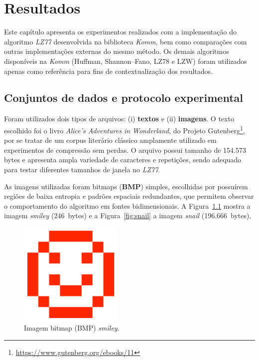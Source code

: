 \chapter{Resultados}\label{cap:Resultados}

Este capítulo apresenta os experimentos realizados com a implementação do algoritmo \textit{LZ77} desenvolvida na biblioteca \textit{Komm}, bem como comparações com outras implementações externas do mesmo método.  
Os demais algoritmos disponíveis na \textit{Komm} (Huffman, Shannon--Fano, LZ78 e LZW) foram utilizados apenas como referência para fins de contextualização dos resultados.

\section{Conjuntos de dados e protocolo experimental}

Foram utilizados dois tipos de arquivos: (i) \textbf{textos} e (ii) \textbf{imagens}.  
O texto escolhido foi o livro \textit{Alice’s Adventures in Wonderland}, do Projeto Gutenberg\footnote{\url{https://www.gutenberg.org/ebooks/11}}, por se tratar de um corpus literário clássico amplamente utilizado em experimentos de compressão sem perdas.  
O arquivo possui tamanho de 154.573 bytes e apresenta ampla variedade de caracteres e repetições, sendo adequado para testar diferentes tamanhos de janela no \textit{LZ77}.  

As imagens utilizadas foram bitmaps (\textbf{BMP}) simples, escolhidas por possuírem regiões de baixa entropia e padrões espaciais redundantes, que permitem observar o comportamento do algoritmo em fontes bidimensionais.  
A Figura~\ref{fig:smiley} mostra a imagem \textit{smiley} (246~bytes) e a Figura~\ref{fig:snail} a imagem \textit{snail} (196.666~bytes).

\begin{figure}[h]
  \centering
  \caption{Imagem bitmap (BMP) \textit{smiley}.}
  \label{fig:smiley}
  \includegraphics[width=5cm]{figuras/smiley-large.png}
\end{figure}

